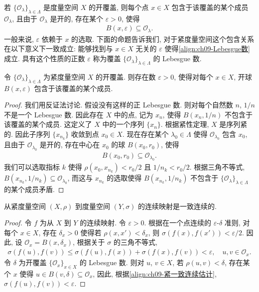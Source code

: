 \documentclass[../../main.tex]{subfiles}
\begin{document}
若 $\{\mathcal{O}_{\lambda}\}_{\lambda\in\Lambda}$ 是度量空间 $X$ 的开覆盖, 则每个点 $x\in X$ 包含于该覆盖的某个成员 $\mathcal{O}_{\lambda}$, 且由于 $\mathcal{O}_{\lambda}$ 是开的, 存在某个 $\varepsilon>0$, 使得
\begin{align}
B(x,\varepsilon)\subseteq\mathcal{O}_{\lambda}.\label{align:ch09-Lebesgue数}
\end{align}
一般来说, $\varepsilon$ 依赖于 $x$ 的选取. 下面的命题告诉我们, 对于紧度量空间这个包含关系在以下意义下一致成立: 能够找到与 $x\in X$ 无关的 $\varepsilon$ 使得\eqref{align:ch09-Lebesgue数}成立. 具有这个性质的正数 $\varepsilon$ 称为覆盖 $\{\mathcal{O}_{\lambda}\}_{\lambda\in\Lambda}$ 的 Lebesgue 数.

\begin{theorem}\label{theorem:ch09-Lebesgue覆盖引理}
令 $\{\mathcal{O}_{\lambda}\}_{\lambda\in\Lambda}$ 为紧度量空间 $X$ 的开覆盖. 则存在数 $\varepsilon>0$, 使得对每个 $x\in X$, 开球 $B(x,\varepsilon)$ 包含于该覆盖的某个成员.
\end{theorem}

\begin{proof}
我们用反证法讨论. 假设没有这样的正 Lebesgue 数. 则对每个自然数 $n$, $1/n$ 不是一个 Lebesgue 数. 因此存在 $X$ 中的点, 记为 $x_{n}$, 使得 $B(x_{n},1/n)$ 不包含于该覆盖的某个成员. 这定义了 $X$ 中的一个序列 $\{x_{n}\}$. 根据紧性定理, $X$ 是序列紧的. 因此子序列 $\{x_{n_{k}}\}$ 收敛到点 $x_{0}\in X$. 现在存在某个 $\lambda_{0}\in\Lambda$ 使得 $\mathcal{O}_{\lambda_{0}}$ 包含 $x_{0}$, 且由于 $\mathcal{O}_{\lambda_{0}}$ 是开的, 存在中心在 $x_{0}$ 的球 $B(x_{0},r_{0})$, 使得
\begin{align*}
B(x_{0},r_{0})\subseteq\mathcal{O}_{\lambda_{0}}.
\end{align*}
我们可以选取指标 $k$ 使得 $\rho(x_{0},x_{n_{k}})<r_{0}/2$ 且 $1/n_{k}<r_{0}/2$. 根据三角不等式, $B(x_{n_{k}},1/n_{k})\subseteq\mathcal{O}_{\lambda_{0}}$, 而这与 $x_{n_{k}}$ 的选取使得 $B(x_{n_{k}},1/n_{k})$ 不包含于 $\{\mathcal{O}_{\lambda}\}_{\lambda\in\Lambda}$ 的某个成员矛盾.
\end{proof}

\begin{proposition}\label{proposition:ch09-紧集连续映射一致连续}
从紧度量空间 $(X,\rho)$ 到度量空间 $(Y,\sigma)$ 的连续映射是一致连续的.
\end{proposition}

\begin{proof}
令 $f$ 为从 $X$ 到 $Y$ 的连续映射. 令 $\varepsilon>0$. 根据在一个点连续的 $\varepsilon$-$\delta$ 准则, 对每个 $x\in X$, 存在 $\delta_{x}>0$ 使得若 $\rho(x,x')<\delta_{x}$, 则 $\sigma(f(x),f(x'))<\varepsilon/2$. 因此, 设 $\mathcal{O}_{x}=B(x,\delta_{x})$, 根据关于 $\sigma$ 的三角不等式,
\begin{align}
\sigma(f(u),f(v))\leqslant\sigma(f(u),f(x))+\sigma(f(x),f(v))<\varepsilon,\quad u,v\in\mathcal{O}_{x}.\label{align:ch09-紧一致连续估计}
\end{align}
令 $\delta$ 为开覆盖 $\{\mathcal{O}_{x}\}_{x\in X}$ 的 Lebesgue 数. 则对 $u$, $v\in X$, 若 $\rho(u,v)<\delta$, 存在某个 $x$ 使得 $u\in B(v,\delta)\subseteq\mathcal{O}_{x}$, 因此, 根据\eqref{align:ch09-紧一致连续估计}, $\sigma(f(u),f(v))<\varepsilon$.
\end{proof}
\end{document}
